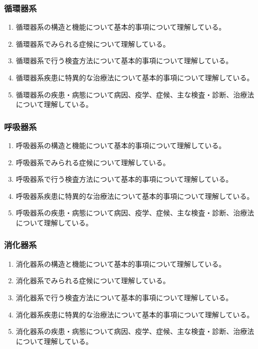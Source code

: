 \hypertarget{ux5faaux74b0ux5668ux7cfb}{%
\subsubsection{循環器系}\label{ux5faaux74b0ux5668ux7cfb}}

\begin{enumerate}
\def\labelenumi{\arabic{enumi}.}
\tightlist
\item
  循環器系の構造と機能について基本的事項について理解している。
\item
  循環器系でみられる症候について理解している。
\item
  循環器系で行う検査方法について基本的事項について理解している。
\item
  循環器系疾患に特異的な治療法について基本的事項について理解している。
\item
  循環器系の疾患・病態について病因、疫学、症候、主な検査・診断、治療法について理解している。
\end{enumerate}

\hypertarget{ux547cux5438ux5668ux7cfb}{%
\subsubsection{呼吸器系}\label{ux547cux5438ux5668ux7cfb}}

\begin{enumerate}
\def\labelenumi{\arabic{enumi}.}
\tightlist
\item
  呼吸器系の構造と機能について基本的事項について理解している。
\item
  呼吸器系でみられる症候について理解している。
\item
  呼吸器系で行う検査方法について基本的事項について理解している。
\item
  呼吸器系疾患に特異的な治療法について基本的事項について理解している。
\item
  呼吸器系の疾患・病態について病因、疫学、症候、主な検査・診断、治療法について理解している。
\end{enumerate}

\hypertarget{ux6d88ux5316ux5668ux7cfb}{%
\subsubsection{消化器系}\label{ux6d88ux5316ux5668ux7cfb}}

\begin{enumerate}
\def\labelenumi{\arabic{enumi}.}
\tightlist
\item
  消化器系の構造と機能について基本的事項について理解している。
\item
  消化器系でみられる症候について理解している。
\item
  消化器系で行う検査方法について基本的事項について理解している。
\item
  消化器系疾患に特異的な治療法について基本的事項について理解している。
\item
  消化器系の疾患・病態について病因、疫学、症候、主な検査・診断、治療法について理解している。
\end{enumerate}

